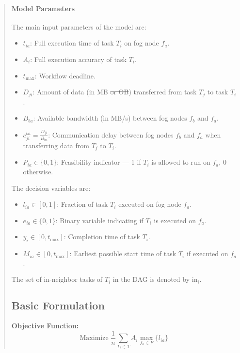 \documentclass[conference]{IEEEtran}
\newcommand{\anninsert}[2]{{\color{#1}#2}}
\newcommand{\anninsert}[2]{#2}
\newcommand{\af}[1]{\anninsert{violet}{#1}}
\begin{document}
\begin{abstract}
\paragraph*{Model Parameters}
The main input parameters of the model are:
\begin{itemize}
    \item \( t_{ia} \): \af{Full execution} time of task \(T_i\) on fog node \(f_a\).
    \item \( A_i \): Full execution accuracy of task \(T_i\).
    \item \( t_{\max} \): Workflow deadline.
    \item \( D_{ji} \): Amount of data (in MB\af{\sout{ or GB}}) transferred from task \(T_j\) to task \(T_i\).
    \item \( B_{ba} \): Available bandwidth (in \af{MB/s}) between fog nodes \(f_b\) and \(f_a\).
    \item \( c_{ji}^{ba} = \frac{D_{ji}}{B_{ba}} \): Communication delay between fog nodes \(f_b\) and \(f_a\) when transferring data from \(T_j\) to \(T_i\).
    \item \( P_{ia} \in \{0,1\} \): Feasibility indicator — 1 if \(T_i\) is allowed to run on \(f_a\), 0 otherwise.
\end{itemize}

\noindent
The decision variables are:
\begin{itemize}
    \item \( l_{ia} \in [0,1] \): Fraction of task \(T_i\) executed on fog node \(f_a\).
    \item \( e_{ia} \in \{0,1\} \): Binary variable indicating if \(T_i\) is executed on \(f_a\).
    \item \( y_i \in [0, t_{\max}] \): Completion time of task \(T_i\).
    \item \( M_{ia} \in [0, t_{\max}] \): Earliest possible start time of task \(T_i\) if executed on \(f_a\).
\end{itemize}

The set of in-neighbor tasks of \(T_i\) in the DAG is denoted by \(\text{in}_i\).

\subsection{Basic Formulation}
\label{sec:basic}

\noindent
\textbf{Objective Function:}
\begin{equation}
\label{eq:objective}
    \text{Maximize } \frac{1}{n} \sum_{T_i \in T} A_i \max_{f_a \in F} \{ l_{ia} \}
\end{equation}


\end{abstract}
\end{document}
